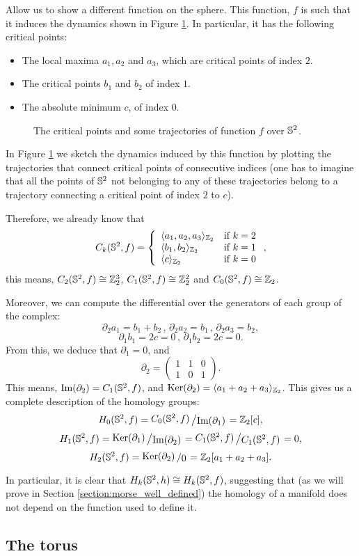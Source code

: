 \begin{exmpl} Allow us to show a different function on the sphere. This function, $f$ is such that it induces the dynamics shown in Figure \ref{figure:example2}. In particular, it has the following critical points:
\begin{itemize}
	\item The local maxima $a_1,a_2$ and $a_3$, which are critical points of index $2$.
	\item The critical points $b_1$ and $b_2$ of index $1$.
	\item The absolute minimum $c$, of index $0$.
\end{itemize}

\begin{figure}[h] \label{figure:example2}
	\centering
	
	\caption{The critical points and some trajectories of function $f$ over $\mathbb{S}^2$.}
\end{figure}

In Figure \ref{figure:example2} we sketch the dynamics induced by this function by plotting the trajectories that connect critical points of consecutive indices (one has to imagine that all the points of $\mathbb{S}^2$ not belonging to any of these trajectories belong to a trajectory connecting a critical point of index $2$ to $c$).

Therefore, we already know that
\[C_k(\mathbb{S}^2,f) = \left\{ \begin{array}{lc} \langle a_1, a_2, a_3 \rangle_{\mathbb{Z}_2} & \text{if } k=2 \\ \langle b_1,b_2\rangle_{\mathbb{Z}_2} & \text{if } k=1 \\ \langle c \rangle_{\mathbb{Z}_2} & \text{if } k=0 \end{array} \right. ,\]
this means, $C_2(\mathbb{S}^2,f) \cong \mathbb{Z}_2^3$, $C_1(\mathbb{S}^2,f) \cong \mathbb{Z}_2^2$ and $C_0(\mathbb{S}^2,f) \cong \mathbb{Z}_2$.

Moreover, we can compute the differential over the generators of each group of the complex:
\[\partial_2 a_1 = b_1+b_2 \, , \, \partial_2 a_2 = b_1 \, , \, \partial_2 a_3 = b_2,\]
\[\partial_1 b_1 = 2c = 0 \, , \, \partial_1 b_2 = 2c = 0 .\]
From this, we deduce that $\partial_1 = 0$, and
\[\partial_2 = \begin{pmatrix} 1 & 1 & 0 \\ 1 & 0 & 1 \end{pmatrix} .\]
This means, $\text{Im}(\partial_2) = C_1(\mathbb{S}^2,f)$, and $\text{Ker}(\partial_2) = \langle a_1+a_2+a_3 \rangle_{\mathbb{Z}_2}$. This gives us a complete description of the homology groups:
\[H_0(\con{S}^2,f) = \quocient{C_0(\con{S}^2,f)}{\text{Im}(\partial_1)} = \con{Z}_2[c] ,\]
\[H_1(\con{S}^2,f) = \quocient{\text{Ker}(\partial_1)}{\text{Im}(\partial_2)} = \quocient{C_1(\con{S}^2,f)}{C_1(\con{S}^2,f)} = 0,\]
\[H_2(\con{S}^2,f) = \quocient{\text{Ker}(\partial_2)}{0} = \con{Z}_2 [a_1+a_2+a_3] .\]

In particular, it is clear that $H_k(\mathbb{S}^2,h) \cong H_k(\mathbb{S}^2,f)$, suggesting that (as we will prove in Section \ref{section:morse_well_defined}) the homology of a manifold does not depend on the function used to define it.
\end{exmpl}

\subsection{The torus}


